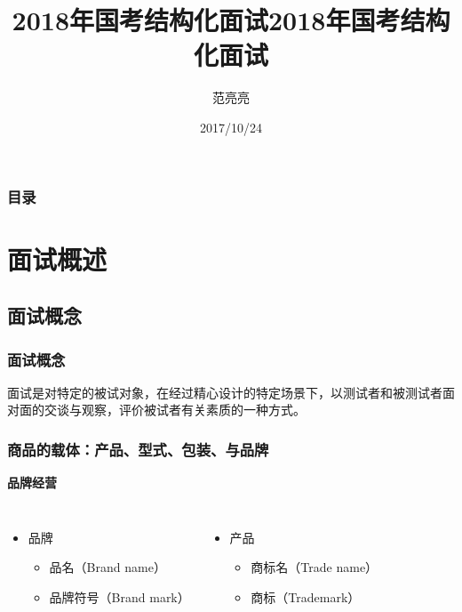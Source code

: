 \documentclass[12pt]{beamer}
\begin{document}
\begin{CJK}{UTF8}{gkai}


\author{范亮亮}
\title{\Large\color{white}\textbf{2018年国考结构化面试}}
\date{2017/10/24}
\begin{frame}
\titlepage
\end{frame}
\title{\color{white}2018年国考结构化面试}
\begin{frame}
\frametitle{目录}
\tableofcontents
\end{frame}
\section{面试概述}

\subsection{面试概念}

\begin{frame}
\frametitle{面试概念}
面试是对特定的被试对象，在经过精心设计的特定场景下，以测试者和被测试者面对面的交谈与观察，评价被试者有关素质的一种方式。

\end{frame}
\begin{frame}
\frametitle{商品的载体：产品、型式、包装、与品牌}
\bfseries\large\color{violet}品牌经营
\mdseries
\begin{columns}
\column{6cm}
\linespread{1.2}
\begin{itemize}
\item  品牌
    \begin{itemize}
    \item  品名（Brand name）
    \item  品牌符号（Brand mark）
    \end{itemize}
\end{itemize}
\begin{itemize}
\item  产品
    \begin{itemize}
    \item  商标名（Trade name）
    \item  商标（Trademark）
    \end{itemize}
\end{itemize}
\end{columns}
\end{frame}

\end{CJK}
\end{document}

